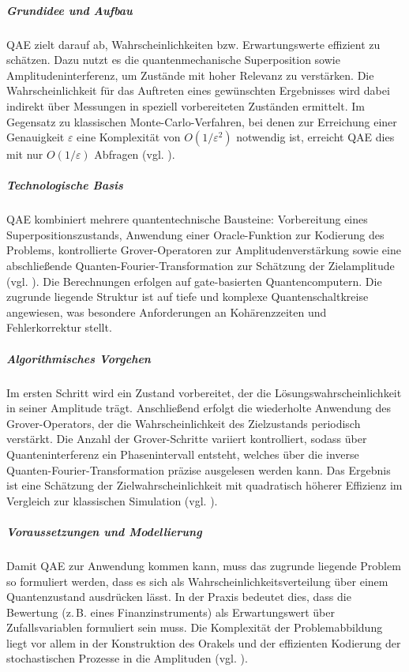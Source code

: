 \subparagraph{Grundidee und Aufbau}
QAE zielt darauf ab, Wahrscheinlichkeiten bzw. Erwartungswerte effizient zu schätzen. Dazu nutzt es die quantenmechanische Superposition sowie Amplitudeninterferenz, um Zustände mit hoher Relevanz zu verstärken. Die Wahrscheinlichkeit für das Auftreten eines gewünschten Ergebnisses wird dabei indirekt über Messungen in speziell vorbereiteten Zuständen ermittelt. Im Gegensatz zu klassischen Monte-Carlo-Verfahren, bei denen zur Erreichung einer Genauigkeit $\varepsilon$ eine Komplexität von $O(1/\varepsilon^2)$ notwendig ist, erreicht QAE dies mit nur $O(1/\varepsilon)$ Abfragen (vgl. \cite{quantumjournal2020, rebentrost_quantum_2018}).

\subparagraph{Technologische Basis}
QAE kombiniert mehrere quantentechnische Bausteine: Vorbereitung eines Superpositionszustands, Anwendung einer Oracle-Funktion zur Kodierung des Problems, kontrollierte Grover-Operatoren zur Amplitudenverstärkung sowie eine abschließende Quanten-Fourier-Transformation zur Schätzung der Zielamplitude (vgl. \cite{martin2022}). Die Berechnungen erfolgen auf gate-basierten Quantencomputern. Die zugrunde liegende Struktur ist auf tiefe und komplexe Quantenschaltkreise angewiesen, was besondere Anforderungen an Kohärenzzeiten und Fehlerkorrektur stellt.

\subparagraph{Algorithmisches Vorgehen}
Im ersten Schritt wird ein Zustand vorbereitet, der die Lösungswahrscheinlichkeit in seiner Amplitude trägt. Anschließend erfolgt die wiederholte Anwendung des Grover-Operators, der die Wahrscheinlichkeit des Zielzustands periodisch verstärkt. Die Anzahl der Grover-Schritte variiert kontrolliert, sodass über Quanteninterferenz ein Phasenintervall entsteht, welches über die inverse Quanten-Fourier-Transformation präzise ausgelesen werden kann. Das Ergebnis ist eine Schätzung der Zielwahrscheinlichkeit mit quadratisch höherer Effizienz im Vergleich zur klassischen Simulation (vgl. \cite{quantumjournal2020, martin2022}).

\subparagraph{Voraussetzungen und Modellierung}
Damit QAE zur Anwendung kommen kann, muss das zugrunde liegende Problem so formuliert werden, dass es sich als Wahrscheinlichkeitsverteilung über einem Quantenzustand ausdrücken lässt. In der Praxis bedeutet dies, dass die Bewertung (z.\,B. eines Finanzinstruments) als Erwartungswert über Zufallsvariablen formuliert sein muss. Die Komplexität der Problemabbildung liegt vor allem in der Konstruktion des Orakels und der effizienten Kodierung der stochastischen Prozesse in die Amplituden (vgl. \cite{rebentrost_quantum_2018}).

